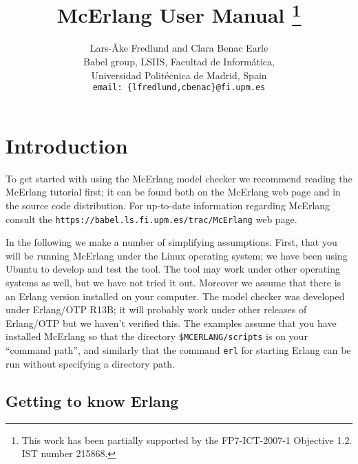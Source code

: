 \documentclass[a4paper]{article}
\begin{document}
\title{McErlang User Manual
\thanks{This work has been partially supported by the FP7-ICT-2007-1 
Objective 1.2. IST number 215868.}}

\author{
Lars-{\AA}ke Fredlund and 
Clara Benac Earle\\
Babel group, LSIIS, Facultad de Inform\'atica, \\
Universidad Polit\'ecnica de Madrid, Spain\\
{\small\texttt{email: \{lfredlund,cbenac\}@fi.upm.es}}}

\date{}

\maketitle 

\tableofcontents

\section{Introduction}

To get started with using the McErlang model checker we recommend
reading the McErlang tutorial first; it can be found both on the
McErlang web page and in the source code distribution.
For up-to-date information regarding McErlang consult the
\texttt{https://babel.ls.fi.upm.es/trac/McErlang} web page.

In the following we make a number of simplifying assumptions.
First, that you will be running McErlang under the Linux operating
system; we have been using Ubuntu to develop and test 
the tool. The tool may work under other operating systems
as well, but we have not tried it out. 
Moreover we assume that there is an Erlang
version installed on your computer. The model checker
was developed under Erlang/OTP R13B; it will probably work
under other releases of Erlang/OTP but we haven't
verified this. The examples assume that you have installed
McErlang so that the directory \texttt{\$MCERLANG/scripts}
is on your ``command path'', and similarly that the command
\texttt{erl} for starting Erlang can be run 
without specifying a directory path.

\subsection{Getting to know Erlang}
\end{document}
